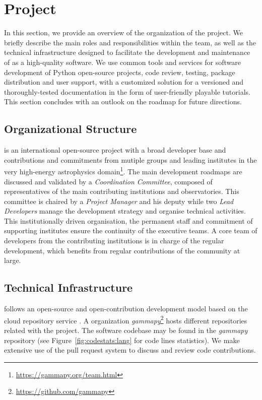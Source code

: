\documentclass[traditabstract, longauth]{aa}
\begin{document}
\section{\gammapy Project} \label{sec:gammapy-project}

In this section, we provide an overview of the organization of the \gammapy
project. We briefly describe the main roles and responsibilities within the
team, as well as the technical infrastructure designed to facilitate the
development and maintenance of \gammapy as a high-quality software. We use
common tools and services for software development of Python open-source
projects, code review, testing, package distribution and user support, with a
customized solution for a versioned and thoroughly-tested documentation in the form
of user-friendly playable tutorials. This section concludes with an outlook on
the roadmap for future directions.

\subsection{Organizational Structure}
\label{ssec:organizational-structure}

\gammapy is an international open-source project with a broad
developer base and contributions and commitments from mutiple groups and
leading institutes in the very high-energy astrophysics
domain\footnote{\url{https://gammapy.org/team.html}}. The main development
roadmaps are discussed and validated by a \textit{Coordination Committee}, composed of
representatives of the main contributing institutions and observatories.
This committee is
chaired by a \textit{Project Manager} and his deputy while two \textit{Lead Developers} manage
the development strategy and organise technical activities. This
institutionally driven organisation, the permanent staff and commitment of
supporting institutes ensure the continuity of the executive teams. A core team
of developers from the contributing institutions is in charge of the regular
development, which benefits from regular contributions of the community at
large.

\subsection{Technical Infrastructure}
\label{ssec:technical-infrastructure}

\gammapy follows an open-source and open-contribution development model based on
the cloud repository service \github. A \github organization
\textit{gammapy}\footnote{\url{https://github.com/gammapy}} hosts different
repositories related with the project. The software codebase may be found in
the \textit{gammapy} repository (see
Figure~\ref{fig:codestats:lang} for code lines statistics). We make extensive
use of the pull request system to discuss and review code contributions.
\end{document}
